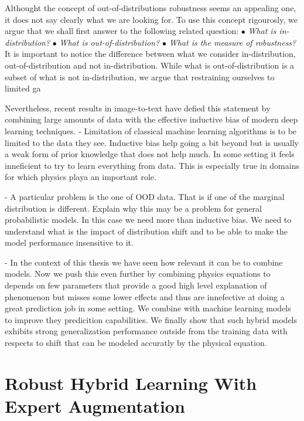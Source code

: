 Althought the concept of out-of-distributions robustness seems an appealing one, it does not say clearly what we are looking for. To use this concept rigourosly, we argue that we shall first answer to the following related question: $\bullet$ \textit{What is in-distribution?} $\bullet$  \textit{What is out-of-distribution?}  $\bullet$ \textit{What is the measure of robustness?} It is important to notice the difference between what we consider in-distribution, out-of-distribution and not in-distribution. While what is out-of-distribution is a subset of what is not in-distribution, we argue that restraining ourselves to limited ga

Nevertheless, recent results in image-to-text have defied this statement by combining large amounts of data with the effective inductive bias of modern deep learning techniques.
- Limitation of classical machine learning algorithms is to be limited to the data they see. Inductive bias help going a bit beyond but is usually a weak form of prior knowledge that does not help much. In some setting it feels inneficient to try to learn everything from data. This is especially true in domains for which physics playa an important role.

- A particular problem is the one of OOD data. That is if one of the marginal distribution is different. Explain why this may be a problem for general probabilistic models. In this case we need more than inductive bias. We need to understand what is the impact of distribution shift and to be able to make the model performance insensitive to it.

- In the context of this thesis we have seen how relevant it can be to combine models. Now we push this even further by combining physics equations to depends on few parameters that provide a good high level explanation of  phenomenon but misses some lower effects and thus are innefective at doing a great prediction job in some setting. We combine with machine learning models to improve they predicition capabilities. We finally show that such hybrid models exhibits strong generalization performance outside from the training data with respects to shift that can be modeled accuratly by the physical equation.

\section{Robust Hybrid Learning With Expert Augmentation}


